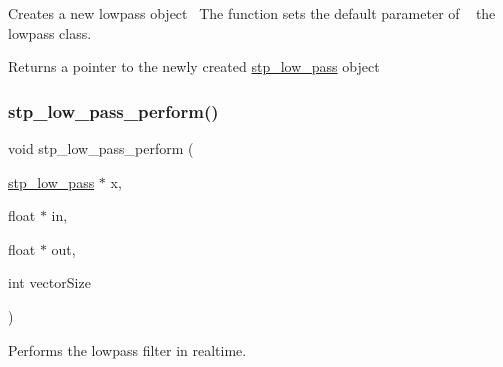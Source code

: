 Creates a new lowpass object~\newline
 The function sets the default parameter of ~\newline
 the lowpass class. 

\begin{DoxyReturn}{Returns}
a pointer to the newly created \hyperlink{structstp__low__pass}{stp\+\_\+low\+\_\+pass} object ~\newline
 
\end{DoxyReturn}
\mbox{\label{structstp__low__pass_a2211d5b417a91ac4cc2b87f3d9b0f346}} 
\subsubsection{\texorpdfstring{stp\+\_\+low\+\_\+pass\+\_\+perform()}{stp\_low\_pass\_perform()}}
{\footnotesize\ttfamily void stp\+\_\+low\+\_\+pass\+\_\+perform (\begin{DoxyParamCaption}\item[{\hyperlink{structstp__low__pass}{stp\+\_\+low\+\_\+pass} $\ast$}]{x,  }\item[{float $\ast$}]{in,  }\item[{float $\ast$}]{out,  }\item[{int}]{vector\+Size }\end{DoxyParamCaption})\hspace{0.3cm}{\ttfamily [related]}}



Performs the lowpass filter in realtime. ~\newline
 


